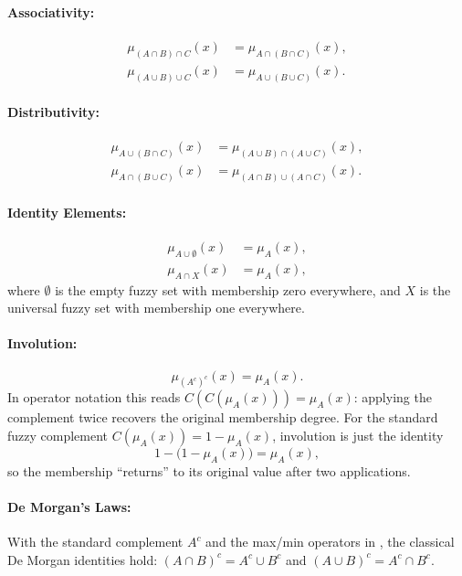 \paragraph{Associativity:}
\begin{align*}
    \mu_{(A \cap B) \cap C}(x) &= \mu_{A \cap (B \cap C)}(x), \\
    \mu_{(A \cup B) \cup C}(x) &= \mu_{A \cup (B \cup C)}(x).
\end{align*}

\paragraph{Distributivity:}
\begin{align*}
    \mu_{A \cup (B \cap C)}(x) &= \mu_{(A \cup B) \cap (A \cup C)}(x), \\
    \mu_{A \cap (B \cup C)}(x) &= \mu_{(A \cap B) \cup (A \cap C)}(x).
\end{align*}

\paragraph{Identity Elements:}
\begin{align*}
    \mu_{A \cup \emptyset}(x) &= \mu_A(x), \\
    \mu_{A \cap X}(x) &= \mu_A(x),
\end{align*}
where $\emptyset$ is the empty fuzzy set with membership zero everywhere, and $X$ is the universal fuzzy set with membership one everywhere.

\paragraph{Involution:}
\[
    \mu_{(A^c)^c}(x) = \mu_A(x).
\]
In operator notation this reads \(C(C(\mu_A(x))) = \mu_A(x)\): applying the complement twice recovers the original membership degree. For the standard fuzzy complement \(C(\mu_A(x)) = 1 - \mu_A(x)\), involution is just the identity
\[
1 - \bigl(1 - \mu_A(x)\bigr) = \mu_A(x),
\]
so the membership ``returns'' to its original value after two applications.

\paragraph{De Morgan's Laws:}
With the standard complement \(A^c\) and the max/min operators in , the classical De Morgan identities hold:
\((A \cap B)^c = A^c \cup B^c\) and \((A \cup B)^c = A^c \cap B^c\).

